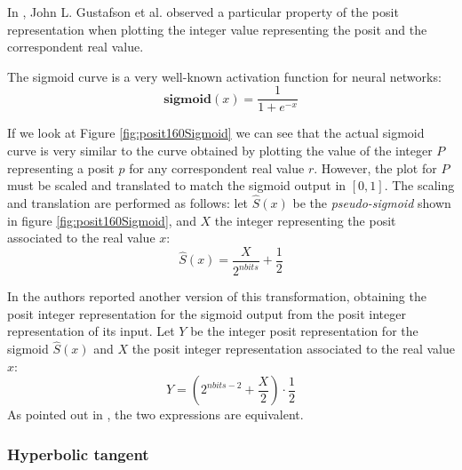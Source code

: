 In \cite{gustafson2017beating}, John L. Gustafson et al. observed a particular property of the posit representation when plotting the integer value representing the posit and the correspondent real value.

The sigmoid curve is a very well-known activation function for neural networks:
\begin{equation}
    \mathbf{sigmoid}(x) = \frac{1}{1 + e^{-x}}
\end{equation}

If we look at Figure \ref{fig:posit160Sigmoid} we can see that the actual sigmoid curve is very similar to the curve obtained by plotting the value of the integer $P$ representing a posit $p$ for any correspondent real value $r$. However, the plot for $P$ must be scaled and translated to match the sigmoid output in $[0,1]$. The scaling and translation are performed as follows: let $\hat{S}(x)$ be the \textit{pseudo-sigmoid} shown in figure \ref{fig:posit160Sigmoid}, and $X$ the integer representing the posit associated to the real value $x$:
\begin{equation}
    \hat{S}(x) = \frac{X}{2^{nbits}} + \frac{1}{2}
\end{equation}

In \cite{gustafson2017beating} the authors reported another version of this transformation, obtaining the posit integer representation for the sigmoid output from the posit integer representation of its input. Let $Y$ be the integer posit representation for the sigmoid $\hat{S}(x)$ and $X$ the posit integer representation associated to the real value $x$:
\begin{equation}\label{eqn:pseudoSigmoidPosit0}
    Y = \left ( 2^{nbits - 2} + \frac{X}{2} \right ) \cdot \frac{1}{2}
\end{equation}
As pointed out in \cite{coco2020sensors}, the two expressions are equivalent.

\subsubsection{Hyperbolic tangent}

